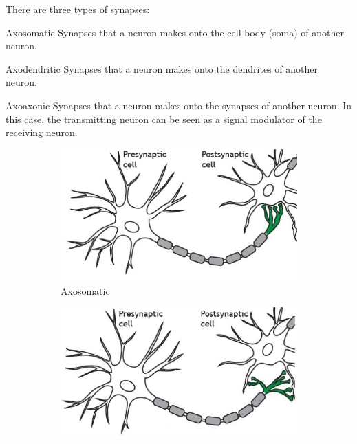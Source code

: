 There are three types of synapses:
\begin{descriptionlist}
    \item[Axosomatic] 
        Synapses that a neuron makes onto the cell body (soma) of another neuron.
    \item[Axodendritic] 
        Synapses that a neuron makes onto the dendrites of another neuron.
    \item[Axoaxonic] 
        Synapses that a neuron makes onto the synapses of another neuron.
        In this case, the transmitting neuron can be seen as a signal modulator of the receiving neuron.
    \begin{figure}[h]
        \begin{subfigure}{.3\textwidth}
            \centering
            \includegraphics[width=\linewidth]{./img/axosomatic.png}
            \caption{Axosomatic}
        \end{subfigure}
        \begin{subfigure}{.3\textwidth}
            \centering
            \includegraphics[width=\linewidth]{./img/axodendritic.png}

\end{subfigure}
\end{figure}
\end{descriptionlist}
